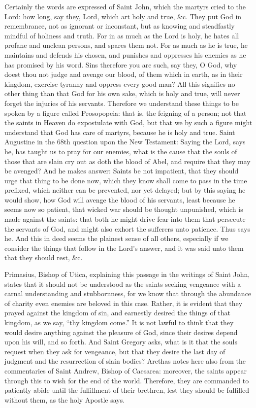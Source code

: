 Certainly the words are expressed of Saint John, which the martyrs cried to the Lord: how long, say they, Lord, which art holy and true, \&c. They put God in remembrance, not as ignorant or inconstant, but as knowing and steadfastly mindful of holiness and truth. For in as much as the Lord is holy, he hates all profane and unclean persons, and spares them not. For as much as he is true, he maintains and defends his chosen, and punishes and oppresses his enemies as he has promised by his word. Sins therefore you are such, say they, O God, why doest thou not judge and avenge our blood, of them which in earth, as in their kingdom, exercise tyranny and oppress every good man? All this signifies no other thing than that God for his own sake, which is holy and true, will never forget the injuries of his servants. Therefore we understand these things to be spoken by a figure called Prosopopeia: that is, the feigning of a person; not that the saints in Heaven do expostulate with God, but that we by such a figure might understand that God has care of martyrs, because he is holy and true. Saint Augustine in the 68th question upon the New Testament: Saying the Lord, says he, has taught us to pray for our enemies, what is the cause that the souls of those that are slain cry out as doth the blood of Abel, and require that they may be avenged? And he makes answer: Saints be not impatient, that they should urge that thing to be done now, which they know shall come to pass in the time prefixed, which neither can be prevented, nor yet delayed; but by this saying he would show, how God will avenge the blood of his servants, least because he seems now so patient, that wicked war should be thought unpunished, which is made against the saints: that both he might drive fear into them that persecute the servants of God, and might also exhort the sufferers unto patience. Thus says he. And this in deed seems the plainest sense of all others, especially if we consider the things that follow in the Lord’s answer, and it was said unto them that they should rest, \&c.

Primasius, Bishop of Utica, explaining this passage in the writings of Saint John, states that it should not be understood as the saints seeking vengeance with a carnal understanding and stubbornness, for we know that through the abundance of charity even enemies are beloved in this case. Rather, it is evident that they prayed against the kingdom of sin, and earnestly desired the things of that kingdom, as we say, “thy kingdom come.” It is not lawful to think that they would desire anything against the pleasure of God, since their desires depend upon his will, and so forth. And Saint Gregory asks, what is it that the souls request when they ask for vengeance, but that they desire the last day of judgment and the resurrection of slain bodies? Arethas notes here also from the commentaries of Saint Andrew, Bishop of Caesarea: moreover, the saints appear through this to wish for the end of the world. Therefore, they are commanded to patiently abide until the fulfillment of their brethren, lest they should be fulfilled without them, as the holy Apostle says.

